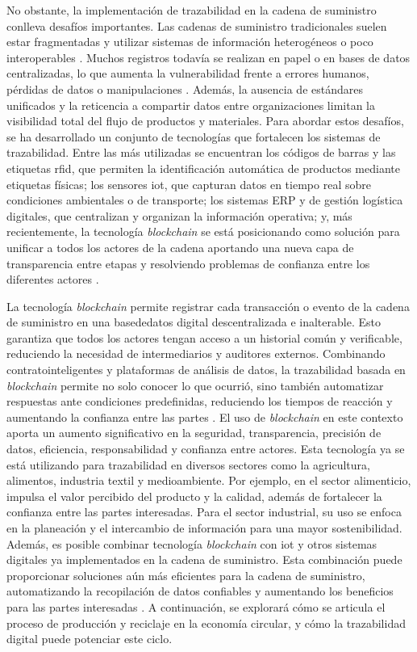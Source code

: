 No obstante, la implementación de trazabilidad en la cadena de suministro conlleva desafíos importantes. Las cadenas de suministro tradicionales suelen estar fragmentadas y utilizar sistemas de información heterogéneos o poco interoperables \cite{torres2022tendencias}. Muchos registros todavía se realizan en papel o en bases de datos centralizadas, lo que aumenta la vulnerabilidad frente a errores humanos, pérdidas de datos o manipulaciones \cite{bartolomeo2020introduccion}. Además, la ausencia de estándares unificados y la reticencia a compartir datos entre organizaciones limitan la visibilidad total del flujo de productos y materiales. Para abordar estos desafíos, se ha desarrollado un conjunto de tecnologías que fortalecen los sistemas de trazabilidad. Entre las más utilizadas se encuentran los códigos de barras y las etiquetas \gls{rfid}, que permiten la identificación automática de productos mediante etiquetas físicas; los sensores \gls{iot}, que capturan datos en tiempo real sobre condiciones ambientales o de transporte; los sistemas ERP y de gestión logística digitales, que centralizan y organizan la información operativa; y, más recientemente, la tecnología \textit{blockchain} se está posicionando como solución para unificar a todos los actores de la cadena aportando una nueva capa de transparencia entre etapas y resolviendo problemas de confianza entre los diferentes actores \cite{wong2024enhancing}.

La tecnología \textit{blockchain} permite registrar cada transacción o evento de la cadena de suministro en una \gls{basededatos} digital descentralizada e inalterable. Esto garantiza que todos los actores tengan acceso a un historial común y verificable, reduciendo la necesidad de intermediarios y auditores externos. Combinando \glspl{contratointeligente} y plataformas de análisis de datos, la trazabilidad basada en \textit{blockchain} permite no solo conocer lo que ocurrió, sino también automatizar respuestas ante condiciones predefinidas, reduciendo los tiempos de reacción y aumentando la confianza entre las partes \cite{wong2024enhancing}. El uso de \textit{blockchain} en este contexto aporta un aumento significativo en la seguridad, transparencia, precisión de datos, eficiencia, responsabilidad y confianza entre actores. Esta tecnología ya se está utilizando para trazabilidad en diversos sectores como la agricultura, alimentos, industria textil y medioambiente. Por ejemplo, en el sector alimenticio, impulsa el valor percibido del producto y la calidad, además de fortalecer la confianza entre las partes interesadas. Para el sector industrial, su uso se enfoca en la planeación y el intercambio de información para una mayor \gls{sostenibilidad}. Además, es posible combinar tecnología \textit{blockchain} con \gls{iot} y otros sistemas digitales ya implementados en la cadena de suministro. Esta combinación puede proporcionar soluciones aún más eficientes para la cadena de suministro, automatizando la recopilación de datos confiables y aumentando los beneficios para las partes interesadas \cite{wong2024enhancing}. A continuación, se explorará cómo se articula el proceso de producción y reciclaje en la economía circular, y cómo la trazabilidad digital puede potenciar este ciclo.

